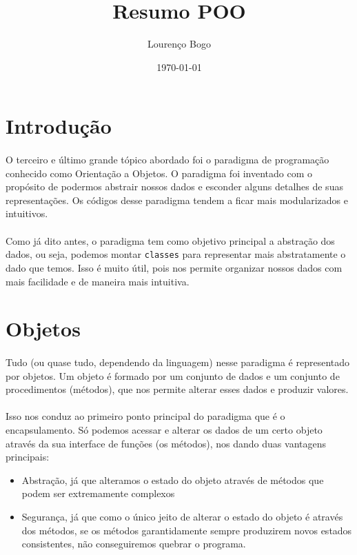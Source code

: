 \documentclass[11pt]{article}
\author{Lourenço Bogo}
\date{\today}
\title{Resumo POO}
\begin{document}
\maketitle
\tableofcontents


\section{Introdução}
\label{sec:org4d86431}
\paragraph{} O terceiro e último grande tópico abordado foi o paradigma de programação conhecido como Orientação a Objetos. O paradigma foi
inventado com o propósito de podermos abstrair nossos dados e esconder alguns detalhes de suas representações. Os códigos desse paradigma
tendem a ficar mais modularizados e intuitivos.

\paragraph{} Como já dito antes, o paradigma tem como objetivo principal a abstração dos dados, ou seja, podemos montar \texttt{classes} para
representar mais abstratamente o dado que temos. Isso é muito útil, pois nos permite organizar nossos dados com mais facilidade e de
maneira mais intuitiva.

\section{Objetos}
\label{sec:orgc33b526}
\paragraph{} Tudo (ou quase tudo, dependendo da linguagem) nesse paradigma é representado por objetos. Um objeto é formado por um conjunto
de dados e um conjunto de procedimentos (métodos), que nos permite alterar esses dados e produzir valores.

\paragraph{} Isso nos conduz ao primeiro ponto principal do paradigma que é o encapsulamento. Só podemos acessar e alterar os dados de um
certo objeto através da sua interface de funções (os métodos), nos dando duas vantagens principais:

\begin{itemize}
\item Abstração, já que alteramos o estado do objeto através de métodos que podem ser extremamente complexos
\item Segurança, já que como o único jeito de alterar o estado do objeto é através dos métodos, se os métodos garantidamente sempre produzirem novos estados consistentes, não conseguiremos quebrar o programa.
\end{itemize}
\end{document}
